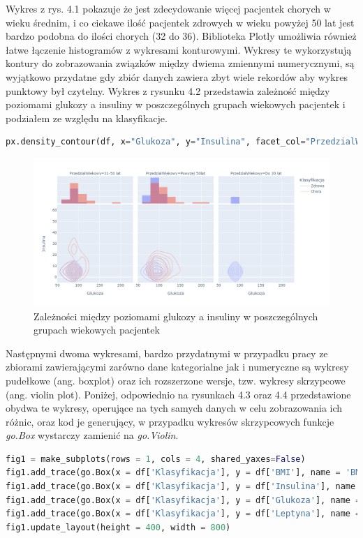 \documentclass[a4paper,12pt,oneside]{book}
\begin{document}
Wykres z rys. 4.1 pokazuje że jest zdecydowanie więcej pacjentek chorych w wieku średnim, i co ciekawe ilość pacjentek zdrowych w wieku powyżej 50 lat jest bardzo podobna do ilości chorych (32 do 36). Biblioteka Plotly umożliwia również łatwe łączenie histogramów z wykresami konturowymi. Wykresy te wykorzystują kontury do zobrazowania związków między dwiema zmiennymi numerycznymi, są wyjątkowo przydatne gdy zbiór danych zawiera zbyt wiele rekordów aby wykres punktowy był czytelny. Wykres z rysunku 4.2 przedstawia zależność między poziomami glukozy a insuliny w poszczególnych grupach wiekowych pacjentek i podziałem ze względu na klasyfikacje.

\begin{lstlisting}[language=Python, caption=Tworzenie wykresu konturowego]
px.density_contour(df, x="Glukoza", y="Insulina", facet_col="PrzedzialWiekowy", color="Klasyfikacja", marginal_x="histogram", height = 600, width = 1000)
\end{lstlisting}

\begin{figure}[h]
\centering
\includegraphics[scale=0.4]{pxdenscontshow.png}
\caption{Zależności między poziomami glukozy a insuliny w poszczególnych grupach wiekowych pacjentek}
\end{figure}

Następnymi dwoma wykresami, bardzo przydatnymi w przypadku pracy ze zbiorami zawierającymi zarówno dane kategorialne jak i numeryczne są wykresy pudełkowe (ang. boxplot) oraz ich rozszerzone wersje, tzw. wykresy skrzypcowe (ang. violin plot). Poniżej, odpowiednio na rysunkach 4.3 oraz 4.4 przedstawione obydwa te wykresy, operujące na tych samych danych w celu zobrazowania ich różnic, oraz kod je generujący, w przypadku wykresów skrzypcowych funkcje \textit{go.Box} wystarczy zamienić na \textit{go.Violin}.


\begin{lstlisting}[language=Python, caption=Tworzenie wykresu pudełkowego]
fig1 = make_subplots(rows = 1, cols = 4, shared_yaxes=False)
fig1.add_trace(go.Box(x = df['Klasyfikacja'], y = df['BMI'], name = 'BMI'),row = 1, col = 1)
fig1.add_trace(go.Box(x = df['Klasyfikacja'], y = df['Insulina'], name = 'Insulina'),row = 1, col = 2)
fig1.add_trace(go.Box(x = df['Klasyfikacja'], y = df['Glukoza'], name = 'Glukoza'),row = 1, col = 3)
fig1.add_trace(go.Box(x = df['Klasyfikacja'], y = df['Leptyna'], name = 'Leptyna'),row = 1, col = 4)
fig1.update_layout(height = 400, width = 800)
\end{lstlisting}
\end{document}

